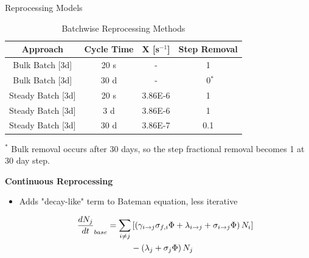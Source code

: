 \documentclass[final]{beamer}
\newlength{\onecolwid}
\newlength{\threecolwid}
\begin{document}
\begin{frame}[t]
\begin{columns}[t,totalwidth=\threecolwid]
\begin{column}{\onecolwid}
\begin{block}{Reprocessing Models}
\begin{table}[H]
\renewcommand{\arraystretch}{1.25}
\caption{Batchwise Reprocessing Methods}
\label{tab:batch_methods}
\begin{center}
\begin{tabular}{ | c | c | c | c | }
 \hline
	Approach & Cycle Time & X [s$^{-1}$] & Step Removal\\
 \hline
 \hline
	Bulk Batch [3d] & 20 s & - & 1\\
	Bulk Batch [3d] & 30 d & - & \, 0$^{*}$ \\
	Steady Batch [3d] & 20 s & 3.86E-6 & 1\\
	Steady Batch [3d] & 3 d & 3.86E-6 & 1\\
	Steady Batch [3d] & 30 d & 3.86E-7 & 0.1\\
 \hline
\end{tabular}
\end{center}
\end{table}
	\begin{center}
\footnotesize{$^{*}$ Bulk removal occurs after 30 days, so the step fractional removal becomes 1 at 30 day step.}\\
	\end{center}

\vspace{0.7em}
\textbf{Continuous Reprocessing}

\begin{itemize}
	\item Adds "decay-like" term to Bateman equation, less iterative \cite{aufiero_extended_2013}


\begin{equation} \hfill
\begin{split}
\frac{dN_j}{dt}_{base} = \sum_{i \neq j}  & \left [ \left( \gamma_{i \rightarrow j} \sigma_{f, i} \Phi + \lambda _{i \rightarrow j} + \sigma_{i \rightarrow j} \Phi \right) N_i \right ]\\
 & - \left ( \lambda_j + \sigma_j \Phi \right ) N_j
\end{split}
\hfill\label{eq:Bateman_default} \end{equation}





\end{itemize}
\end{block}
\end{column}
\end{columns}
\end{frame}
\end{document}
